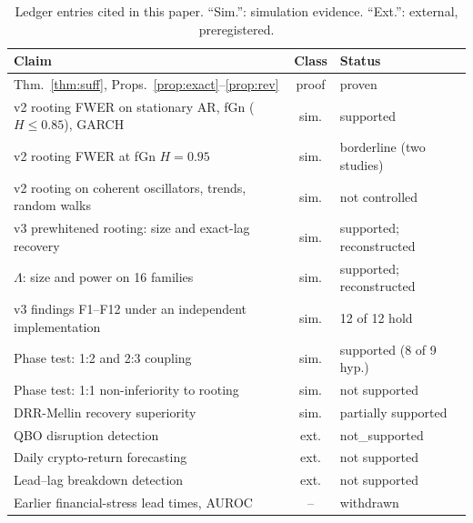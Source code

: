 \documentclass[10pt,twocolumn,letterpaper]{article}
\theoremstyle{definition}
\theoremstyle{remark}
\begin{document}
\begin{table}[t]
\centering\footnotesize
\caption{Ledger entries cited in this paper. ``Sim.'': simulation evidence.
``Ext.'': external, preregistered.}
\label{tab:ledger}
\setlength{\tabcolsep}{2.5pt}
\begin{tabular}{@{}L{0.55\columnwidth}cL{0.3\columnwidth}@{}}
\toprule
Claim & Class & Status\\
\midrule
Thm.~\ref{thm:suff}, Props.~\ref{prop:exact}--\ref{prop:rev} & proof & proven\\
v2 rooting FWER on stationary AR, fGn ($H\le0.85$), GARCH & sim. & supported\\
v2 rooting FWER at fGn $H=0.95$ & sim. & borderline (two studies)\\
v2 rooting on coherent oscillators, trends, random walks & sim. & not controlled\\
v3 prewhitened rooting: size and exact-lag recovery & sim. & supported; reconstructed\\
$\Lambda$: size and power on 16 families & sim. & supported; reconstructed\\
v3 findings F1--F12 under an independent implementation & sim. & 12 of 12 hold\\
Phase test: 1:2 and 2:3 coupling & sim. & supported (8 of 9 hyp.)\\
Phase test: 1:1 non-inferiority to rooting & sim. & not supported\\
DRR-Mellin recovery superiority & sim. & partially supported\\
QBO disruption detection & ext. & not\_supported\\
Daily crypto-return forecasting & ext. & not supported\\
Lead--lag breakdown detection & ext. & not supported\\
Earlier financial-stress lead times, AUROC & -- & withdrawn\\
\bottomrule
\end{tabular}
\end{table}
\end{document}
